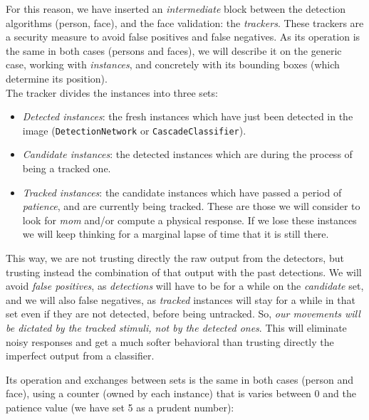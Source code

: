 	For this reason, we have inserted an \emph{intermediate} block between the detection algorithms (person, face), and the face validation: the \emph{trackers}. These trackers are a security measure to avoid false positives and false negatives. As its operation is the same in both cases (persons and faces), we will describe it on the generic case, working with \emph{instances}, and concretely with its bounding boxes (which determine its position).\\
	
	The tracker divides the instances into three sets:
	\begin{itemize}
		\item \emph{Detected instances}: the fresh instances which have just been detected in the image (\texttt{DetectionNetwork} or \texttt{CascadeClassifier}).
		
		\item \emph{Candidate instances}: the detected instances which are during the process of being a tracked one.
		
		\item \emph{Tracked instances}: the candidate instances which have passed a period of \emph{patience}, and are currently being tracked. These are those we will consider to look for \emph{mom} and/or compute a physical response. If we lose these instances we will keep thinking for a marginal lapse of time that it is still there.
	\end{itemize}
	
	This way, we are not trusting directly the raw output from the detectors, but trusting instead the combination of that output with the past detections. We will avoid \emph{false positives}, as \emph{detections} will have to be for a while on the \emph{candidate} set, and we will also false negatives, as \emph{tracked} instances will stay for a while in that set even if they are not detected, before being untracked. So, \emph{our movements will be dictated by the tracked stimuli, not by the detected ones}. This will eliminate noisy responses and get a much softer behavioral than trusting directly the imperfect output from a classifier.
	
	Its operation and exchanges between sets is the same in both cases (person and face), using a counter (owned by each instance) that is varies between 0 and the patience value (we have set 5 as a prudent number):
	
